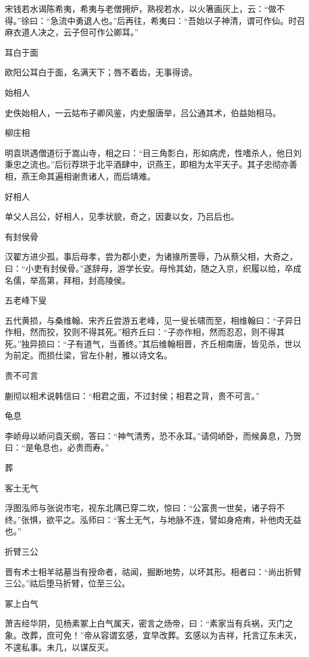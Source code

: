 \documentclass[a4paper,12pt,UTF8,twoside]{ctexbook}
\begin{document}
    宋钱若水谒陈希夷，希夷与老僧拥炉，熟视若水，以火箸画灰上，云：“做不得。”徐曰：“急流中勇退人也。”后再往，希夷曰：“吾始以子神清，谓可作仙。时召麻衣道人决之，云子但可作公卿耳。”
    
    耳白于面
    
    欧阳公耳白于面，名满天下；唇不着齿，无事得谤。
    
    始相人
    
    史佚始相人，一云姑布子卿风鉴，内史服唐举，吕公通其术，伯益始相马。
    
    柳庄相
    
    明袁珙遇僧道衍于嵩山寺，相之曰：“目三角彯白，形如病虎，性嗜杀人，他日刘秉忠之流也。”后衍荐珙于北平酒肆中，识燕王，即相为太平天子。其子忠彻亦善相，燕王命其遍相谢贵诸人，而后靖难。
    
    好相人
    
    单父人吕公，好相人，见季状貌，奇之，因妻以女，乃吕后也。
    
    有封侯骨
    
    汉翟方进少孤，事后母孝，尝为郡小吏，为诸掾所詈辱，乃从蔡父相，大奇之，曰：“小吏有封侯骨。”遂辞母，游学长安。母怜其幼，随之入京，织履以给，卒成名儒，举高第，拜相，封高陵侯。
    
    五老峰下叟
    
    五代黄损，与桑维翰、宋齐丘尝游五老峰，见一叟长啸而至，相维翰曰：“子异日作相，然而狡，狡则不得其死。”相齐丘曰：“子亦作相，然而忍忍，则不得其死。”独异损曰：“子有道气，当善终。”其后维翰相晋，齐丘相南唐，皆见杀，世以为前定。而损仕梁，官左仆射，雅以诗文名。
    
    贵不可言
    
    蒯彻以相术说韩信曰：“相君之面，不过封侯；相君之背，贵不可言。”
    
    龟息
    
    李峤母以峤问袁天纲，答曰：“神气清秀，恐不永耳。”请伺峤卧，而候鼻息，乃贺曰：“是龟息也，必贵而寿。”
    
    葬
    
    客土无气
    
    浮图泓师与张说市宅，视东北隅已穿二坎，惊曰：“公富贵一世矣，诸子将不终。”张惧，欲平之。泓师曰：“客土无气，与地脉不连，譬如身疮痏，补他肉无益也。”
    
    折臂三公
    
    晋有术士相羊祜墓当有授命者，祜闻，掘断地势，以坏其形。相者曰：“尚出折臂三公。”祜后堕马折臂，位至三公。
    
    冢上白气
    
    萧吉经华阴，见杨素冢上白气属天，密言之炀帝，曰：“素家当有兵祸，灭门之象。改葬，庶可免！”帝从容谓玄感，宜早改葬。玄感以为吉祥，托言辽东未灭，不遑私事。未几，以谋反灭。
    
\end{document}
